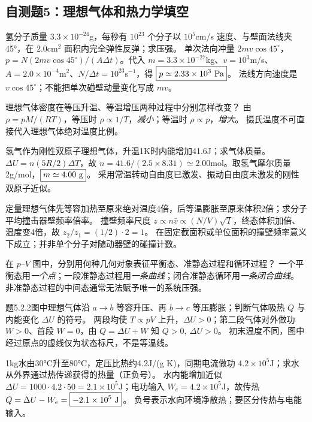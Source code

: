 \subsection{自测题5：理想气体和热力学填空}

\problemtext 氢分子质量 $3.3\times10^{-24}$g，每秒有 $10^{23}$ 个分子以 $10^5$cm/s 速度、与壁面法线夹45°，在 $2.0$cm$^2$ 面积内完全弹性反弹；求压强。
\workings 单次法向冲量 $2mv\cos45^\circ$，$p=N(2mv\cos45^\circ)/(A\Delta t)$。代入 $m=3.3\times10^{-27}$kg、$v=10^3$m/s、$A=2.0\times10^{-4}$m$^2$、$N/\Delta t=10^{23}$s$^{-1}$，得 $\boxed{p\simeq2.33\times10^3\ {\rm Pa}}$。
\crosscheck 法线方向速度是 $v\cos45^\circ$；不能把单次碰壁动量变化写成 $mv$。

\problemtext 理想气体密度在等压升温、等温增压两种过程中分别怎样改变？
\workings 由 $\rho=pM/(RT)$，等压时 $\rho\propto1/T$，\emph{减小}；等温时 $\rho\propto p$，\emph{增大}。
\crosscheck 摄氏温度不可直接代入理想气体绝对温度比例。

\problemtext 氢气作为刚性双原子理想气体，升温1K时内能增加41.6J；求气体质量。
\workings $\Delta U=n(5R/2)\Delta T$，故 $n=41.6/(2.5\times8.31)\simeq2.00$mol。取氢气摩尔质量2g/mol，$\boxed{m\simeq4.00\ {\rm g}}$。
\crosscheck 采用常温转动自由度已激发、振动自由度未激发的刚性双原子近似。

\problemtext 定量理想气体先等容加热至原来绝对温度4倍，后等温膨胀至原来体积2倍；求分子平均撞击器壁频率倍率。
\workings 撞壁频率尺度 $z\propto n\bar v\propto (N/V)\sqrt T$，终态体积加倍、温度变4倍，故 $z_2/z_1=(1/2)\cdot2=\boxed{1}$。
\crosscheck 在固定截面积或单位面积的撞壁频率意义下成立；并非单个分子对随动器壁的碰撞计数。

\problemtext 在 $p$--$V$ 图中，分别用何种几何对象表征平衡态、准静态过程和循环过程？
\workings 一个平衡态用\emph{一个点}；一段准静态过程用\emph{一条曲线}；闭合准静态循环用\emph{一条闭合曲线}。
\crosscheck 非准静态过程的中间态通常无法赋予唯一的系统压强。

\problemtext 题5.2.2图中理想气体沿 $a\to b$ 等容升压、再 $b\to c$ 等压膨胀；判断气体吸热 $Q$ 与内能变化 $\Delta U$ 的符号。
\workings 两段均使 $T\propto pV$ 上升，$\Delta U>0$；第二段气体对外做功 $W>0$、首段 $W=0$，由 $Q=\Delta U+W$ 知 $\boxed{Q>0,\ \Delta U>0}$。
\crosscheck 初末温度不同，图中经过原点的虚线仅为状态标尺，不是等温线。

\problemtext 1kg水由30°C升至80°C，定压比热约4.2J/(g K)，同期电流做功 $4.2\times10^5$J；求水从外界通过热传递获得的热量（正负号）。
\workings 水内能增加近似 $\Delta U=1000\cdot4.2\cdot50=2.1\times10^5$J；电功输入 $W_e=4.2\times10^5$J，故传热 $Q=\Delta U-W_e=\boxed{-2.1\times10^5\ {\rm J}}$。
\crosscheck 负号表示水向环境净散热；要区分传热与电能输入。

